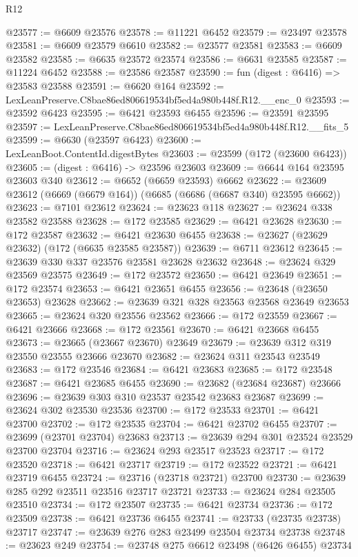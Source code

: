 \begin{lexlean}{R12}
\begin{coremodule}
@23577 := @6609 @23576
@23578 := @11221 @6452
@23579 := @23497 @23578
@23581 := @6609 @23579 @6610
@23582 := @23577 @23581
@23583 := @6609 @23582
@23585 := @6635 @23572 @23574
@23586 := @6631 @23585
@23587 := @11224 @6452
@23588 := @23586 @23587
@23590 := fun (digest : @6416) => @23583 @23588
@23591 := @6620 @164
@23592 := LexLeanPreserve.C8bae86ed806619534bf5ed4a980b448f.R12.__enc_0
@23593 := @23592 @6423
@23595 := @6421 @23593 @6455
@23596 := @23591 @23595
@23597 := LexLeanPreserve.C8bae86ed806619534bf5ed4a980b448f.R12.__fits_5
@23599 := @6630 (@23597 @6423)
@23600 := LexLeanBoot.ContentId.digestBytes
@23603 := @23599 (@172 (@23600 @6423))
@23605 := (digest : @6416) -> @23596 @23603
@23609 := @6644 @164 @23595 @23603 @340
@23612 := @6652 (@6659 @23593) @6662
@23622 := @23609 @23612 (@6669 (@6679 @164)) (@6685 (@6686 (@6687 @340) @23595 @6662))
@23623 := @7101 @23612
@23624 := @23623 @118
@23627 := @23624 @338 @23582 @23588
@23628 := @172 @23585
@23629 := @6421 @23628
@23630 := @172 @23587
@23632 := @6421 @23630 @6455
@23638 := @23627 (@23629 @23632) (@172 (@6635 @23585 @23587))
@23639 := @6711 @23612
@23645 := @23639 @330 @337 @23576 @23581 @23628 @23632
@23648 := @23624 @329 @23569 @23575
@23649 := @172 @23572
@23650 := @6421 @23649
@23651 := @172 @23574
@23653 := @6421 @23651 @6455
@23656 := @23648 (@23650 @23653) @23628
@23662 := @23639 @321 @328 @23563 @23568 @23649 @23653
@23665 := @23624 @320 @23556 @23562
@23666 := @172 @23559
@23667 := @6421 @23666
@23668 := @172 @23561
@23670 := @6421 @23668 @6455
@23673 := @23665 (@23667 @23670) @23649
@23679 := @23639 @312 @319 @23550 @23555 @23666 @23670
@23682 := @23624 @311 @23543 @23549
@23683 := @172 @23546
@23684 := @6421 @23683
@23685 := @172 @23548
@23687 := @6421 @23685 @6455
@23690 := @23682 (@23684 @23687) @23666
@23696 := @23639 @303 @310 @23537 @23542 @23683 @23687
@23699 := @23624 @302 @23530 @23536
@23700 := @172 @23533
@23701 := @6421 @23700
@23702 := @172 @23535
@23704 := @6421 @23702 @6455
@23707 := @23699 (@23701 @23704) @23683
@23713 := @23639 @294 @301 @23524 @23529 @23700 @23704
@23716 := @23624 @293 @23517 @23523
@23717 := @172 @23520
@23718 := @6421 @23717
@23719 := @172 @23522
@23721 := @6421 @23719 @6455
@23724 := @23716 (@23718 @23721) @23700
@23730 := @23639 @285 @292 @23511 @23516 @23717 @23721
@23733 := @23624 @284 @23505 @23510
@23734 := @172 @23507
@23735 := @6421 @23734
@23736 := @172 @23509
@23738 := @6421 @23736 @6455
@23741 := @23733 (@23735 @23738) @23717
@23747 := @23639 @276 @283 @23499 @23504 @23734 @23738
@23748 := @23623 @249
@23754 := @23748 @275 @6612 @23498 (@6426 @6455) @23734

\end{coremodule}
\end{lexlean}
